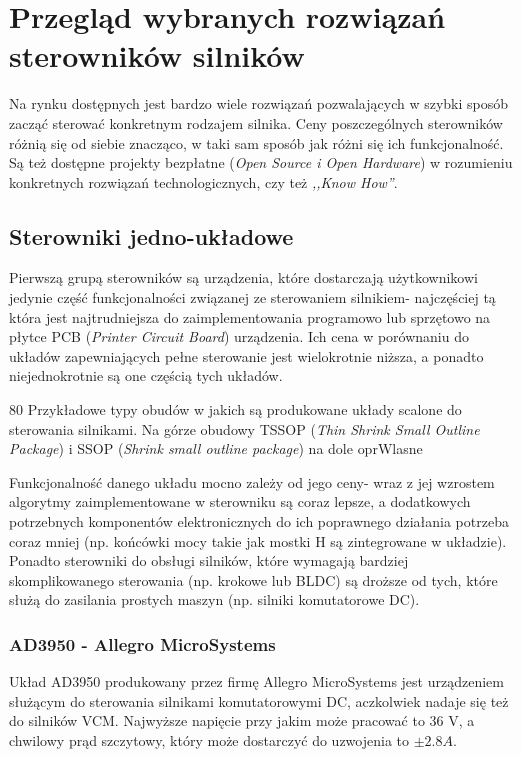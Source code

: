 \section{Przegląd wybranych rozwiązań sterowników silników}
\label{s:sterowniki} 

Na rynku dostępnych jest bardzo wiele rozwiązań pozwalających w szybki sposób zacząć sterować konkretnym rodzajem silnika. Ceny poszczególnych sterowników różnią się od siebie znacząco, w taki sam sposób jak różni się ich funkcjonalność. Są też dostępne projekty bezpłatne ({\it Open Source i Open Hardware}) w rozumieniu konkretnych rozwiązań technologicznych, czy też {\it ,,Know How''}.

\subsection{Sterowniki jedno-układowe}

Pierwszą grupą sterowników są urządzenia, które dostarczają użytkownikowi jedynie część funkcjonalności związanej ze sterowaniem silnikiem- najczęściej tą która jest najtrudniejsza do zaimplementowania programowo lub sprzętowo na płytce PCB ({\it Printer Circuit Board}) urządzenia. Ich cena w porównaniu do układów zapewniających pełne sterowanie jest wielokrotnie niższa, a ponadto niejednokrotnie są one częścią tych układów. 

	{80}
	{Przykładowe typy obudów w jakich są produkowane układy scalone do sterowania silnikami. Na górze obudowy TSSOP ({\it Thin Shrink Small Outline Package}) i SSOP ({\it Shrink small outline package}) na dole}
	{oprWlasne}

Funkcjonalność danego układu mocno zależy od jego ceny- wraz z jej wzrostem algorytmy zaimplementowane w sterowniku są coraz lepsze, a dodatkowych potrzebnych komponentów elektronicznych do ich poprawnego działania potrzeba coraz mniej (np. końcówki mocy takie jak mostki H są zintegrowane w układzie). Ponadto sterowniki do obsługi silników, które wymagają bardziej skomplikowanego sterowania (np. krokowe lub BLDC) są droższe od tych, które służą do zasilania prostych maszyn (np. silniki komutatorowe DC). 

\subsubsection{AD3950 - Allegro MicroSystems}
\label{ss:allegro}

Układ AD3950 produkowany przez firmę Allegro MicroSystems jest urządzeniem służącym do sterowania silnikami komutatorowymi DC, aczkolwiek nadaje się też do silników VCM. Najwyższe napięcie przy jakim może pracować to 36 V, a chwilowy prąd szczytowy, który może dostarczyć do uzwojenia to $ \pm2.8 A $.

